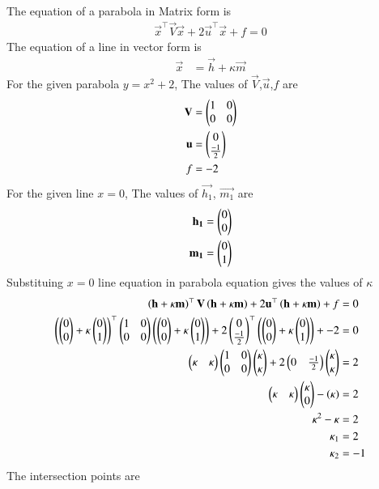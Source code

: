 \documentclass[journal]{IEEEtran}
\begin{document}
The equation of a parabola in Matrix form is
\begin{align}
\vec{x}^\top\vec{V}\vec{x} + 2\vec{u}^\top\vec{x} + f = 0
\end{align}
The equation of a line in vector form is
\begin{align}
\vec{x}&=\vec{h}+\kappa\vec{m}
\end{align}
For the given parabola $y=x^2+2$, The values of $\vec{V}$,$\vec{u}$,$f$ are
\begin{align}
\mathbf{V}&=\begin{pmatrix}1 & 0\\0 & 0\end{pmatrix}\\
\mathbf{u}&=\begin{pmatrix}0\\\frac{-1}{2}\end{pmatrix}\\
f&=-2
\end{align}
For the given line $x=0$, The values of $\vec{h_1}$, $\vec{m_1}$ are
\begin{align}
\mathbf{h_1}&=\begin{pmatrix}0\\0\end{pmatrix}\\
\mathbf{m_1}&=\begin{pmatrix}0\\1\end{pmatrix}
\end{align}
Substituing $x=0$ line equation in parabola equation gives the values of $\kappa$
\begin{align}
\left(\mathbf{h}+\kappa\mathbf{m}\right)^\top\mathbf{V}\left(\mathbf{h}+\kappa\mathbf{m}\right) + 2\mathbf{u}^\top\left(\mathbf{h}+\kappa\mathbf{m}\right) + f &= 0\\
\left(\begin{pmatrix}0\\0\end{pmatrix}+\kappa\begin{pmatrix}0\\1\end{pmatrix}\right)^\top\begin{pmatrix}1 & 0\\0 & 0\end{pmatrix}\left(\begin{pmatrix}0\\0\end{pmatrix}+\kappa\begin{pmatrix}0\\1\end{pmatrix}\right) + 2\begin{pmatrix}0\\\frac{-1}{2}\end{pmatrix}^\top\left(\begin{pmatrix}0\\0\end{pmatrix}+\kappa\begin{pmatrix}0\\1\end{pmatrix}\right) + -2 &= 0\\
\begin{pmatrix}\kappa&\kappa\end{pmatrix}\begin{pmatrix}1&0\\0&0\end{pmatrix}\begin{pmatrix}\kappa\\\kappa\end{pmatrix}+2\begin{pmatrix}0&\frac{-1}{2}\end{pmatrix}\begin{pmatrix}\kappa\\\kappa\end{pmatrix} &= 2\\
\begin{pmatrix}\kappa&\kappa\end{pmatrix}\begin{pmatrix}\kappa\\0\end{pmatrix}-\left(\kappa\right) &= 2\\
\kappa^2-\kappa &= 2\\
\kappa_1&=2\\
\kappa_2&=-1
\end{align}
The intersection points are
\end{document}
